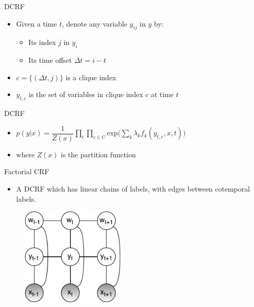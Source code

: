 \documentclass[presentation,bigger]{beamer}
\begin{document}
\begin{frame}[label={sec:orgheadline12}]{DCRF}
\begin{definition}
\begin{itemize}
\item Given a time \(t\), denote any variable \(y_{ij}\) in \(y\) by:
\begin{itemize}
\item Its index \(j\) in \(y_i\)
\item Its time offset \(\Delta t = i-t\)
\end{itemize}
\item \(c = \{(\Delta t, j)\}\) is a clique index
\item \(y_{t,c}\) is the set of variables in clique index \(c\) at time \(t\)
\end{itemize}
\end{definition}
\end{frame}
\begin{frame}[label={sec:orgheadline13}]{DCRF}
\begin{definition}
\begin{itemize}
\item \(p(y|x) = \dfrac{1}{Z(x)}\displaystyle \prod_{t}\prod_{c \in C} \text{exp}\Bigg(\sum_k \lambda_k f_k(y_{t,c},x,t)\Bigg)\)
\item where \(Z(x)\) is the partition function
\end{itemize}
\end{definition}
\end{frame}
\begin{frame}[label={sec:orgheadline14}]{Factorial CRF}
\begin{itemize}
\item A DCRF which has linear chains of labels, with edges between cotemporal labels.
\end{itemize}
\begin{figure}[htb]
\centering
\includegraphics[width=5cm]{figures/FCRF.pdf}
\end{figure}
\end{frame}
\end{document}
